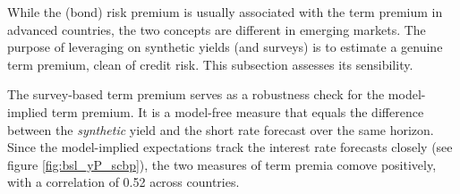 {While the (bond) risk premium is usually associated with the term premium in advanced countries, the two concepts are different in emerging markets.
The purpose of leveraging on synthetic yields (and surveys) is to estimate a genuine term premium, clean of credit risk.
This subsection assesses its sensibility.

The survey-based term premium serves as a robustness check for the model-implied term premium.
It is a model-free measure that equals the difference between the \textit{synthetic} yield and the short rate forecast over the same horizon.
Since the model-implied expectations track the interest rate forecasts closely (see figure \ref{fig:bsl_yP_scbp}), the two measures of term premia comove positively, with a correlation of 0.52 across countries.

}

